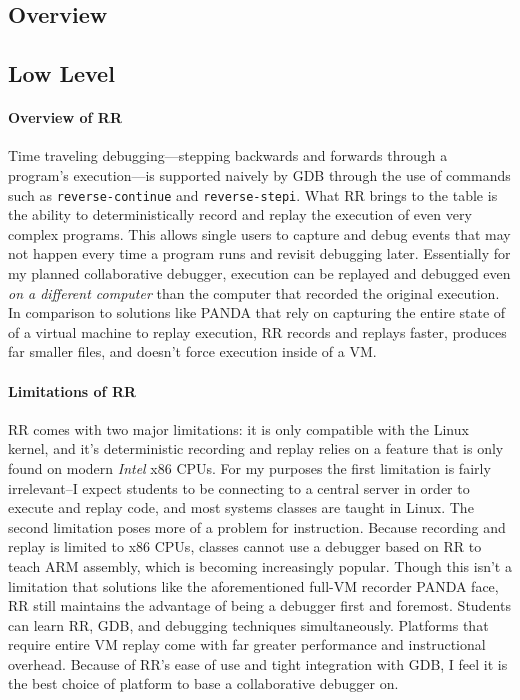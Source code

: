 \documentclass[12pt]{article}
\begin{document}
\subsection{Overview}

\begin{tikzpicture} [node distance=2em, start chain=going right,]

\end{tikzpicture}

\subsection{Low Level}

\paragraph{Overview of RR}

Time traveling debugging---stepping backwards and forwards through a
program's execution---is supported naively by GDB through the use of
commands such as \lstinline{reverse-continue} and
\lstinline{reverse-stepi}.\cite{gdbman} What RR brings to the table is
the ability to deterministically record and replay the execution of
even very complex programs.  This allows single users to capture and
debug events that may not happen every time a program runs and revisit
debugging later.  Essentially for my planned collaborative debugger,
execution can be replayed and debugged even \textit{on a different
  computer} than the computer that recorded the original execution.
In comparison to solutions like PANDA\cite{10.1145/2843859.2843867}
that rely on capturing the entire state of of a virtual machine to
replay execution, RR records and replays faster, produces far smaller
files, and doesn't force execution inside of a
VM.\cite{DBLP:journals/corr/OCallahanJFHNP17}

\paragraph{Limitations of RR}

RR comes with two major limitations: it is only compatible with the
Linux kernel, and it's deterministic recording and replay relies on a
feature that is only found on modern \textit{Intel} x86 CPUs.  For my
purposes the first limitation is fairly irrelevant--I expect students
to be connecting to a central server in order to execute and replay
code, and most systems classes are taught in Linux.  The second
limitation poses more of a problem for instruction.  Because recording
and replay is limited to x86 CPUs, classes cannot use a debugger based
on RR to teach ARM assembly, which is becoming increasingly popular.
Though this isn't a limitation that solutions like the aforementioned
full-VM recorder PANDA face, RR still maintains the advantage of being
a debugger first and foremost.  Students can learn RR, GDB, and
debugging techniques simultaneously.  Platforms that require entire VM
replay come with far greater performance and instructional overhead.
Because of RR's ease of use and tight integration with GDB, I feel it
is the best choice of platform to base a collaborative debugger on.
\end{document}
